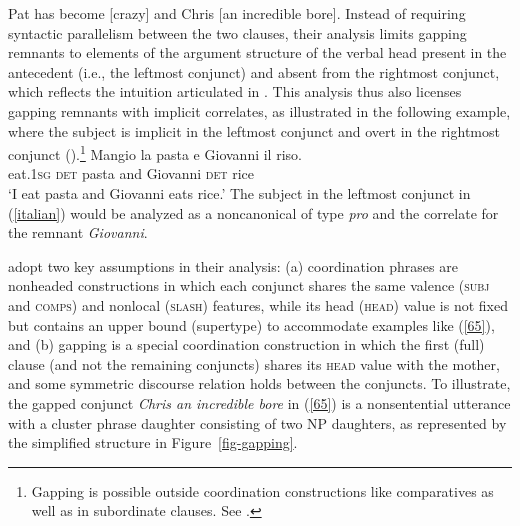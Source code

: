 \ea Pat has become [crazy] and Chris [an incredible bore]. \citep[248]{Abeille2014}  \label{65}\z
\largerpage
Instead of requiring %
syntactic parallelism between the two clauses, their analysis limits gapping remnants to elements of the argument structure of the verbal head present in the antecedent (i.e., the leftmost conjunct) and absent from the rightmost conjunct, which reflects the intuition articulated in \citet{Hankamer1971}. This analysis thus also licenses gapping remnants with implicit correlates, as illustrated in the
following  example, where the subject is implicit in the leftmost conjunct and overt in the rightmost conjunct (\citealt[251]{Abeille2014}).\footnote{Gapping is possible outside coordination
constructions like comparatives as well as in 
subordinate clauses. See .}
\ea
\label{italian}
\gll Mangio la pasta e Giovanni il riso.\\
     eat.\textsc{1sg} \textsc{det} pasta and Giovanni \textsc{det} rice\\
\glt `I eat pasta and Giovanni eats rice.'
\z
%
The subject in the leftmost conjunct in (\ref{italian}) would be analyzed as a noncanonical  of type {\it pro} and the correlate for the remnant {\it Giovanni}. %

\citet{Abeille2014} adopt two key assumptions in their analysis: (a) coordination phrases are nonheaded constructions in which each conjunct shares the same
valence (\textsc{subj} and \textsc{comps}) and nonlocal (\textsc{slash}) features, while
 its head (\textsc{head}) value is not fixed but contains an upper bound (supertype) to accommodate examples like (\ref{65}), and (b) gapping is a special coordination construction in which the first (full) clause (and not the remaining conjuncts) shares its \textsc{head} value with the mother,  
 and some symmetric discourse relation holds between the conjuncts. 
 To illustrate, the gapped conjunct \emph{Chris an incredible bore} in (\ref{65}) is a nonsentential utterance with a
 cluster phrase daughter consisting of two NP daughters, as represented by the simplified structure
 in Figure~\ref{fig-gapping}. 
 
